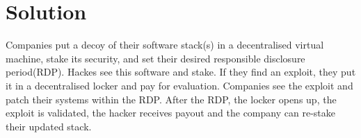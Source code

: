 \vspace{-0.16cm}
\section{Solution}
\vspace{-0.15cm}
Companies put a decoy of their software stack(s) in a decentralised virtual machine, stake its security, and set their desired responsible disclosure period(RDP). Hackes see this software and stake. If they find an exploit, they put it in a decentralised locker and pay for evaluation. Companies see the exploit and patch their systems within the RDP. After the RDP, the locker opens up, the exploit is validated, the hacker receives payout and the company can re-stake their updated stack.